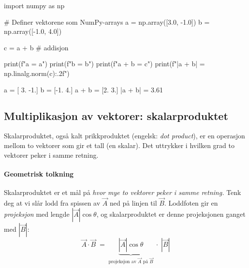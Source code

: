 \begin{pythonkode}
import numpy as np

# Definer vektorene som NumPy-arrays
a = np.array([3.0, -1.0])
b = np.array([-1.0,  4.0])

c = a + b   # addisjon

print(f"a       = {a}")
print(f"b       = {b}")
print(f"a + b   = {c}")
print(f"|a + b| = {np.linalg.norm(c):.2f}")
\end{pythonkode}
\begin{pythonoutput}
a       = [ 3. -1.]
b       = [-1.  4.]
a + b   = [2. 3.]
|a + b| = 3.61
\end{pythonoutput}


\subsection*{Multiplikasjon av vektorer: skalarproduktet}
Skalarproduktet, også kalt prikkproduktet (engelsk: \textit{dot product}), er en operasjon mellom to vektorer som gir et tall (en skalar). Det uttrykker i hvilken grad to vektorer peker i samme retning.


\paragraph{Geometrisk tolkning}

Skalarproduktet er et mål på \emph{hvor mye to vektorer peker i samme retning.} Tenk deg at vi slår lodd fra spissen av $\vec{A}$ ned på linjen til $\vec{B}$. Loddfoten gir en \emph{projeksjon} med lengde $|\vec{A}|\cos\theta$, og skalarproduktet er denne projeksjonen ganget med $|\vec{B}|$:
\[
\vec{A}\cdot\vec{B} \;=\;
\underbrace{|\vec{A}|\cos\theta}_{\text{projeksjon av }\vec{A}\text{ på }\vec{B}}
\;\cdot\; |\vec{B}|
\]

